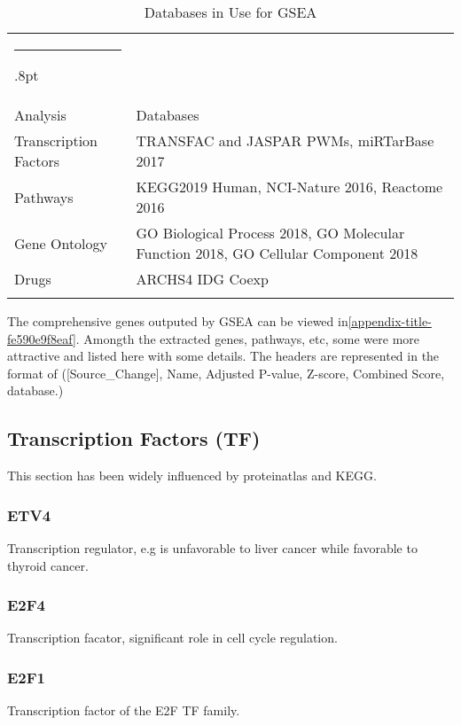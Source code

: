 \documentclass[3p,authoryear,preprint,12pt]{elsarticle}
\makeatletter
\def\hlinewd#1{%
  \noalign{\ifnum0=`}\fi\hrule \@height #1%
  \futurelet\reserved@a\@xhline}
\def\tbltoprule{\hlinewd{.8pt}\\[-12pt]}
\def\tblbottomrule{\noalign{\vspace*{6pt}}\hline\noalign{\vspace*{2pt}}}
\def\tblmidrule{\noalign{\vspace*{6pt}}\hline\noalign{\vspace*{2pt}}}
\makeatother
\begin{document}
\begin{table*}[!htbp]
\caption{{Databases in Use for GSEA} }
\label{tw-de478ae31cc6}
\def\arraystretch{1}
\ignorespaces 
\centering 
\begin{tabulary}{\linewidth}{p{\dimexpr.2732\tabcolsep}p{\dimexpr.7267999999999999\tabcolsep}}
\tbltoprule Analysis & Databases\\
\tblmidrule 
Transcription Factors &
  TRANSFAC and JASPAR PWMs, miRTarBase 2017\\
Pathways &
  KEGG2019 Human, NCI-Nature 2016, Reactome 2016\\
Gene Ontology &
  GO Biological Process 2018, GO Molecular Function 2018, GO Cellular Component 2018\\
Drugs &
  ARCHS4 IDG Coexp\\
\tblbottomrule 
\end{tabulary}\par 
\end{table*}
The comprehensive genes outputed by GSEA can be viewed in\ref{appendix-title-fe590e9f8eaf}. Amongth the extracted genes, pathways, etc, some were more attractive and listed here with some details. The headers are represented in the format of ([Source\_Change], Name, Adjusted P-value, Z-score, Combined Score, database.) %



\subsection{Transcription Factors (TF)}This section has been widely influenced by proteinatlas and  KEGG.

\subsubsection{ETV4}Transcription regulator, e.g is unfavorable to liver cancer while favorable to thyroid cancer.

\subsubsection{E2F4}Transcription facator, significant role in cell cycle regulation. 

\subsubsection{E2F1}Transcription factor of the E2F TF family.
\end{document}
